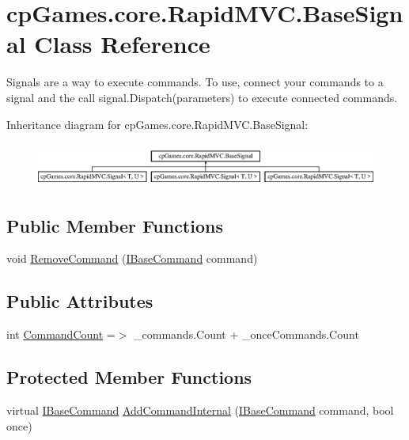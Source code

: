 \hypertarget{classcp_games_1_1core_1_1_rapid_m_v_c_1_1_base_signal}{}\section{cp\+Games.\+core.\+Rapid\+M\+V\+C.\+Base\+Signal Class Reference}
\label{classcp_games_1_1core_1_1_rapid_m_v_c_1_1_base_signal}


Signals are a way to execute commands. To use, connect your commands to a signal and the call signal.\+Dispatch(parameters) to execute connected commands.  


Inheritance diagram for cp\+Games.\+core.\+Rapid\+M\+V\+C.\+Base\+Signal\+:\begin{figure}[H]
\begin{center}
\leavevmode
\includegraphics[height=1.469816cm]{classcp_games_1_1core_1_1_rapid_m_v_c_1_1_base_signal}
\end{center}
\end{figure}
\subsection*{Public Member Functions}
\begin{DoxyCompactItemize}
\item 
void \mbox{\hyperlink{classcp_games_1_1core_1_1_rapid_m_v_c_1_1_base_signal_aa97df2a65a67878d56a83df578f09bc8}{Remove\+Command}} (\mbox{\hyperlink{interfacecp_games_1_1core_1_1_rapid_m_v_c_1_1_i_base_command}{I\+Base\+Command}} command)
\end{DoxyCompactItemize}
\subsection*{Public Attributes}
\begin{DoxyCompactItemize}
\item 
int \mbox{\hyperlink{classcp_games_1_1core_1_1_rapid_m_v_c_1_1_base_signal_a3f273a225810de09d155144a5e948257}{Command\+Count}} =$>$ \+\_\+commands.\+Count + \+\_\+once\+Commands.\+Count
\end{DoxyCompactItemize}
\subsection*{Protected Member Functions}
\begin{DoxyCompactItemize}
\item 
virtual \mbox{\hyperlink{interfacecp_games_1_1core_1_1_rapid_m_v_c_1_1_i_base_command}{I\+Base\+Command}} \mbox{\hyperlink{classcp_games_1_1core_1_1_rapid_m_v_c_1_1_base_signal_ab3899ea2a251c554f2b7ec3e6f4a9ed3}{Add\+Command\+Internal}} (\mbox{\hyperlink{interfacecp_games_1_1core_1_1_rapid_m_v_c_1_1_i_base_command}{I\+Base\+Command}} command, bool once)
\end{DoxyCompactItemize}
